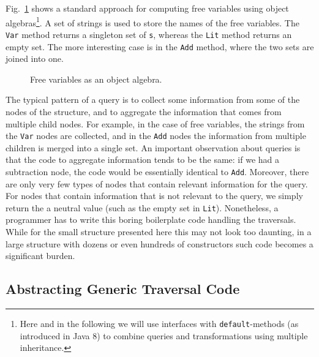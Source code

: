 Fig.~\ref{freevars_without_monoid} shows a
standard approach for computing free variables using object algebras\footnote{Here and in the following we will use interfaces with \lstinline{default}-methods (as introduced in Java 8) to combine queries and transformations using multiple inheritance.}.
A set of strings is used to store the names of the free variables. The
\lstinline{Var} method returns a singleton set of \lstinline{s},
whereas the \lstinline{Lit} method returns an empty set. The
more interesting case is in the \lstinline{Add} method, where the two
sets are joined into one.

\begin{figure}[t]
\nocaptionrule
\caption{Free variables as an object algebra.}
\label{freevars_without_monoid}
\end{figure}
\begin{comment}
\bruno{put code in a figure, add a caption and refer
  to the figure in the text.}
\end{comment}

The typical pattern of a query is to collect some information from
some of the nodes of the structure, and to aggregate the information
that comes from multiple child nodes. For example, in the case of free
variables, the strings from the \lstinline{Var} nodes are collected,
and in the \lstinline{Add} nodes the information from multiple
children is merged into a single set. An important observation about
queries is that the code to aggregate information tends to be the
same: if we had a subtraction node, the code would be essentially
identical to \lstinline{Add}. Moreover, there are only very few types
of nodes that contain relevant information for the query. For nodes
that contain information that is not relevant to the query, we simply
return the a neutral value (such as the empty set in \lstinline{Lit}).
Nonetheless, a programmer has to write this boring boilerplate code
handling the traversals.  While for the small structure presented here
this may not look too daunting, in a large structure with dozens or
even hundreds of constructors such code becomes a significant burden.


\subsection{Abstracting Generic Traversal Code}\label{subsec:genericquery}

